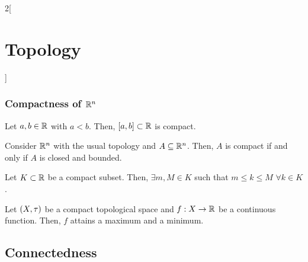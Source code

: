 \documentclass[../../../main.tex]{subfiles}
\begin{document}
\begin{multicols}{2}[\section{Topology}]
  \subsubsection{Compactness of \texorpdfstring{$\mathbb{R}^n$}{Rn}}
  \begin{theorem}
    Let $a,b\in\mathbb{R}$ with $a<b$. Then, $[a,b]\subset\mathbb{R}$ is compact.
  \end{theorem}
  \begin{theorem}
    Consider $\mathbb{R}^n$ with the usual topology and $A\subseteq \mathbb{R}^n$. Then, $A$ is compact if and only if $A$ is closed and bounded.
  \end{theorem}
  \begin{lemma}
    Let $K\subset\mathbb{R}$ be a compact subset. Then, $\exists m,M\in K$ such that $m\leq k\leq M$ $\forall k\in K$.
  \end{lemma}
  \begin{theorem}
    Let $(X,\tau)$ be a compact topological space and $f:X\rightarrow\mathbb{R}$ be a continuous function. Then, $f$ attains a maximum and a minimum.
  \end{theorem}

  \subsection{Connectedness}

\end{multicols}
\end{document}
